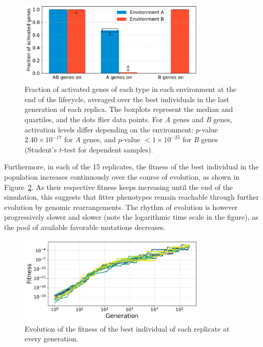\begin{figure}[H]
\centering
\includegraphics[width=0.8\textwidth]{alife/img/mean_activation.pdf}
\caption[Fraction of activated genes of each type at the end of evolution in the proof-of-concept model]{Fraction of activated genes of each type in each environment at the end of the lifecycle, averaged over the best individuals in the last generation of each replica.
The boxplots represent the median and quartiles, and the dots flier data points.
For \emph{A} genes and \emph{B} genes, activation levels differ depending on the environment: $p$-value $2.40\times10^{-17}$ for \emph{A} genes, and $p$-value $<1\times10^{-25}$ for \emph{B} genes (Student's $t$-test for dependent samples).}
\label{fig:alife:mean_activ}
\end{figure}

Furthermore, in each of the 15 replicates, the fitness of the best individual in the population increases continuously over the course of evolution, as shown in Figure~\ref{fig:alife:fitnesses}.
As their respective fitness keeps increasing until the end of the simulation, this suggests that fitter phenotypes remain reachable through further evolution by genomic rearrangements.
The rhythm of evolution is however progressively slower and slower (note the logarithmic time scale in the figure), as the pool of available favorable mutations decreases.

\begin{figure}[H]
\centering
\includegraphics[width=0.8\textwidth]{alife/img/all_fitness.pdf}
\caption[Fitness of every replicate during evolution in the proof-of-concept model]{Evolution of the fitness of the best individual of each replicate at every generation.}
\label{fig:alife:fitnesses}
\end{figure}

